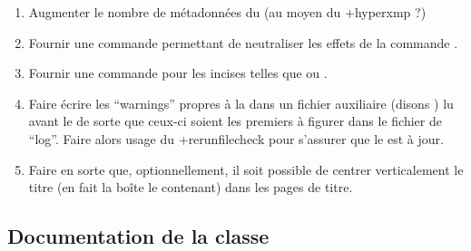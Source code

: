 \begin{enumerate}
\item Augmenter le nombre de métadonnées du  (au moyen du
  \Package+{hyperxmp} ?)
\item Fournir une commande  permettant de
  neutraliser les effets de la commande .
\item Fournir une commande  pour les incises telles que
   ou .
\item Faire écrire les \foreignquote{english}{warnings} propres à la \yatCl{}
  dans un fichier auxiliaire (disons ) lu avant le  de
  sorte que ceux-ci soient les premiers à figurer dans le fichier de
  \foreignquote{english}{log}. Faire alors usage du \Package*+{rerunfilecheck}
  pour s'assurer que le  est à jour.
\item Faire en sorte que, optionnellement, il soit possible de centrer
  verticalement le titre (en fait la boîte le contenant) dans les pages de
  titre.
\end{enumerate}

\subsection{Documentation de la classe}
\label{sec-documentation-de-la-ult}


